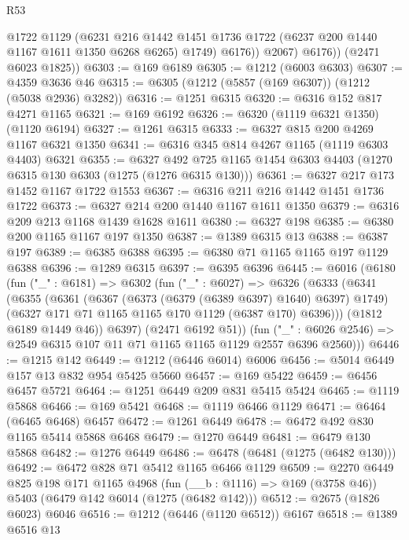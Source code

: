 \begin{lexlean}{R53}
\begin{coremodule}
                @1722
                @1129
                (@6231
                  @216
                  @1442
                  @1451
                  @1736
                  @1722
                  (@6237 @200 @1440 @1167 @1611 @1350 @6268 @6265)
                  @1749)
                @6176))
            @2067)
          @6176))
      (@2471 @6023 @1825))
@6303 := @169 @6189
@6305 := @1212 (@6003 @6303)
@6307 := @4359 @3636 @46
@6315 := @6305 (@1212 (@5857 (@169 @6307)) (@1212 (@5038 @2936) @3282))
@6316 := @1251 @6315
@6320 := @6316 @152 @817 @4271 @1165
@6321 := @169 @6192
@6326 := @6320 (@1119 @6321 @1350) (@1120 @6194)
@6327 := @1261 @6315
@6333 := @6327 @815 @200 @4269 @1167 @6321 @1350
@6341 := @6316 @345 @814 @4267 @1165 (@1119 @6303 @4403) @6321
@6355 := @6327 @492 @725 @1165 @1454 @6303 @4403 (@1270 @6315 @130 @6303 (@1275 (@1276 @6315 @130)))
@6361 := @6327 @217 @173 @1452 @1167 @1722 @1553
@6367 := @6316 @211 @216 @1442 @1451 @1736 @1722
@6373 := @6327 @214 @200 @1440 @1167 @1611 @1350
@6379 := @6316 @209 @213 @1168 @1439 @1628 @1611
@6380 := @6327 @198
@6385 := @6380 @200 @1165 @1167 @197 @1350
@6387 := @1389 @6315 @13
@6388 := @6387 @197
@6389 := @6385 @6388
@6395 := @6380 @71 @1165 @1165 @197 @1129 @6388
@6396 := @1289 @6315
@6397 := @6395 @6396
@6445 := @6016
    (@6180
      (fun ("_" : @6181) =>
      @6302
        (fun ("_" : @6027) =>
        @6326
          (@6333
            (@6341
              (@6355
                (@6361
                  (@6367 (@6373 (@6379 (@6389 @6397) @1640) @6397) @1749)
                  (@6327 @171 @71 @1165 @1165 @170 @1129 (@6387 @170) @6396)))
              (@1812 @6189 @1449 @46))
            @6397)
          (@2471 @6192 @51))
        (fun ("_" : @6026 @2546) => @2549 @6315 @107 @11 @71 @1165 @1165 @1129 @2557 @6396 @2560)))
@6446 := @1215 @142
@6449 := @1212 (@6446 @6014) @6006
@6456 := @5014 @6449 @157 @13 @832 @954 @5425 @5660
@6457 := @169 @5422
@6459 := @6456 @6457 @5721
@6464 := @1251 @6449 @209 @831 @5415 @5424
@6465 := @1119 @5868
@6466 := @169 @5421
@6468 := @1119 @6466 @1129
@6471 := @6464 (@6465 @6468) @6457
@6472 := @1261 @6449
@6478 := @6472 @492 @830 @1165 @5414 @5868 @6468
@6479 := @1270 @6449
@6481 := @6479 @130 @5868
@6482 := @1276 @6449
@6486 := @6478 (@6481 (@1275 (@6482 @130)))
@6492 := @6472 @828 @71 @5412 @1165 @6466 @1129
@6509 := @2270
    @6449
    @825
    @198
    @171
    @1165
    @4968
    (fun (__b : @1116) => @169 (@3758 @46))
    @5403
    (@6479 @142 @6014 (@1275 (@6482 @142)))
@6512 := @2675 (@1826 @6023) @6046
@6516 := @1212 (@6446 (@1120 @6512)) @6167
@6518 := @1389 @6516 @13

\end{coremodule}
\end{lexlean}
